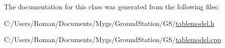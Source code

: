 The documentation for this class was generated from the following files\+:\begin{DoxyCompactItemize}
\item 
C\+:/\+Users/\+Roman/\+Documents/\+Mygs/\+Ground\+Station/\+G\+S/\hyperlink{tablemodel_8h}{tablemodel.\+h}\item 
C\+:/\+Users/\+Roman/\+Documents/\+Mygs/\+Ground\+Station/\+G\+S/\hyperlink{tablemodel_8cpp}{tablemodel.\+cpp}\end{DoxyCompactItemize}
